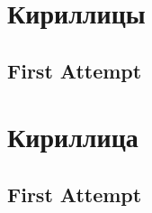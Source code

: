 \documentclass[a4paper,oneside,12pt]{memoir}
\begin{document}
 
\chapter{Кириллицы}
\section{First Attempt}

\chapter*{Кириллица}
 
\section{First Attempt}
 
 
\end{document}
